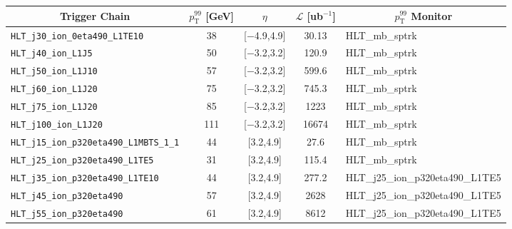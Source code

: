 \documentclass[NOTE, atlasdraft=true, texlive=2020, UKenglish]{atlasdoc}
\newcommand{\PTE}{p_{\text{T}}}
\newcommand{\TN}[1]{ \text{#1} }
\begin{document}
\begin{table}[!ht]
\centering
\begin{tabular}{ | c | c | c | c | c |}
           \hline
           \textbf{Trigger Chain} &  \textbf{$\PTE^{99}$ [GeV]} & \textbf{$\eta$} & \textbf{$\mathscr{L}$ [ub$^{-1}$]} & \textbf{$p_{\TN{T}}^{99}$ Monitor}\\
            \hline
            \multicolumn{1}{|l|}{\texttt{HLT\_j30\_ion\_0eta490\_L1TE10}}   & 38  & [$-$4.9,4.9]   & 30.13 &  \multicolumn{1}{l|}{\scriptsize HLT\_mb\_sptrk} \\
            \hline
            \multicolumn{1}{|l|}{\texttt{HLT\_j40\_ion\_L1J5}}    & 50     & [$-$3.2,3.2]   & 120.9 &  \multicolumn{1}{l|}{\scriptsize HLT\_mb\_sptrk}\\
            \hline
            \multicolumn{1}{|l|}{\texttt{HLT\_j50\_ion\_L1J10}}    & 57    & [$-$3.2,3.2]   & 599.6 &  \multicolumn{1}{l|}{\scriptsize HLT\_mb\_sptrk}\\
            \hline
            \multicolumn{1}{|l|}{\texttt{HLT\_j60\_ion\_L1J20}} & 75        & [$-$3.2,3.2]   & 745.3 &  \multicolumn{1}{l|}{\scriptsize HLT\_mb\_sptrk}\\
            \hline
            \multicolumn{1}{|l|}{\texttt{HLT\_j75\_ion\_L1J20}}   & 85  & [$-$3.2,3.2]   & 1223 &  \multicolumn{1}{l|}{\scriptsize HLT\_mb\_sptrk}\\
            \hline
            \multicolumn{1}{|l|}{\texttt{HLT\_j100\_ion\_L1J20}}   & 111 & [$-$3.2,3.2]   & 16674 &  \multicolumn{1}{l|}{\scriptsize HLT\_mb\_sptrk}\\
            \hline
            \multicolumn{1}{|l|}{\texttt{HLT\_j15\_ion\_p320eta490\_L1MBTS\_1\_1}}   & 44  & [3.2,4.9]   & 27.6 &  \multicolumn{1}{l|}{\scriptsize HLT\_mb\_sptrk}\\
            \hline
            \multicolumn{1}{|l|}{\texttt{HLT\_j25\_ion\_p320eta490\_L1TE5}}   & 31  & [3.2,4.9]   & 115.4 &  \multicolumn{1}{l|}{\scriptsize HLT\_mb\_sptrk}\\
            \hline
            \multicolumn{1}{|l|}{\texttt{HLT\_j35\_ion\_p320eta490\_L1TE10}}   & 44  & [3.2,4.9]   & 277.2 &  \multicolumn{1}{l|}{\tiny HLT\_j25\_ion\_p320eta490\_L1TE5}\\
            \hline
            \multicolumn{1}{|l|}{\texttt{HLT\_j45\_ion\_p320eta490}}   & 57  & [3.2,4.9]   & 2628 &  \multicolumn{1}{l|}{\tiny HLT\_j25\_ion\_p320eta490\_L1TE5}\\
            \hline
            \multicolumn{1}{|l|}{\texttt{HLT\_j55\_ion\_p320eta490}}   & 61  & [3.2,4.9]   & 8612 &  \multicolumn{1}{l|}{\tiny HLT\_j25\_ion\_p320eta490\_L1TE5}\\

\end{tabular}
\end{table}
\end{document}
